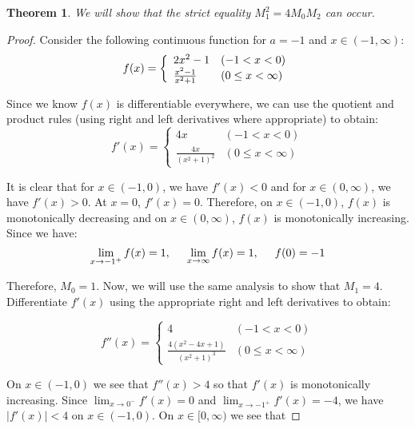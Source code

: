 \documentclass[psamsfonts]{amsart}
\newtheorem{thm}{Theorem}[section]
\theoremstyle{definition}
\theoremstyle{remark}
\numberwithin{equation}{section}
\begin{document}
\begin{thm}
We will show that the strict equality $M_1^2 = 4M_0 M_2$ can occur.
\end{thm}

\begin{proof}
Consider the following continuous function for $a = -1$ and $x \in (-1, \infty)$:
\begin{equation}
f(x) = \left\{ \begin{array}{l l}
2x^2 - 1 & (-1 < x < 0) \\
\frac{x^2 - 1}{x^2 + 1} & (0 \leq x < \infty) \end{array} \right.  
\end{equation}

Since we know $f(x)$ is differentiable everywhere, we can use the quotient and product rules (using right and left derivatives where appropriate) to obtain:
\begin{equation}
f'(x) = \left\{ \begin{array}{ll}
4x & (-1 <x <0) \\
\frac{4x}{(x^2 +1)^2} & (0 \leq x < \infty) 
\end{array} \right. 
\end{equation}

It is clear that for $x \in (-1,0)$, we have $f'(x) < 0$ and for $x \in (0,\infty)$, we have $f'(x) > 0$. At $x = 0$, $f'(x) = 0$. Therefore, on $x \in (-1,0)$, $f(x)$ is monotonically decreasing and on $x \in (0,\infty)$, $f(x)$ is monotonically increasing. Since we have:
\begin{equation}
\lim_{x \to -1^{+}} f(x) = 1, \hspace{0.5cm} \lim_{x \to \infty} f(x) = 1, \hspace{0.5cm} f(0) = -1
\end{equation}

Therefore, $M_0 = 1$. Now, we will use the same analysis to show that $M_1 = 4$. Differentiate $f'(x)$ using the appropriate right and left derivatives to obtain:

\begin{equation}
f''(x) = \left\{ \begin{array}{ll}
4 & (-1 < x < 0) \\
\frac{4(x^2 - 4x + 1)}{(x^2+1)^3} & (0 \leq x < \infty) 
\end{array} \right.
\end{equation}

On $x \in (-1,0)$ we see that $f''(x) > 4$ so that $f'(x)$ is monotonically increasing. Since $\lim_{x \to 0^{-}} f'(x) =  0$ and $\lim_{x \to -1^{+}} f'(x) = -4$, we have $|f'(x)| < 4$ on $x \in (-1,0)$. On $x \in [0, \infty)$ we see that 


\end{proof}
\end{document}
